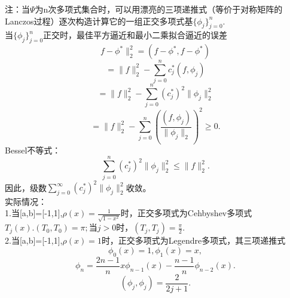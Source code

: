 \documentclass[a4paper,12pt]{article}
\begin{document}
\begin{CJK*}{UTF8}{gbsn}
	注：当$\Psi$为n次多项式集合时，可以用漂亮的三项递推式（等价于对称矩阵的Lanczos过程）逐次构造计算它的一组正交多项式基$\{\phi_j\}_{j=0}^n$.\\
	当$\{\phi_j\}_{j=0}^n$正交时，最佳平方逼近和最小二乘拟合逼近的误差
	$$f-\phi^*\|_2^2 = (f-\phi^*,f-\phi^*)$$
	$$=\|f\|_2^2-\sum\limits_{j=0}^nc_j^*(f,\phi_j)$$
	$$=\|f\|_2^2 - \sum\limits_{j=0}^n(c_j^*)^2\|\phi_j\|_2^2$$
	$$=\|f\|_2^2 - \sum\limits_{j=0}^n(\frac{(f,\phi_j)}{\|\phi_j\|_2})^2\ge 0.$$
	Bessel不等式：
	$$
		\sum\limits_{j=0}^n(c_j^*)^2\|\phi_j\|_2^2\le \|f\|_2^2.
	$$
	因此，级数$\sum\limits_{j=0}^\infty(c_j^*)^2\|\phi_j\|_2^2$收敛。\\
	实际情况：\\
	1.当[a,b]=[-1,1],$\rho(x)=\frac{1}{\sqrt{1-x^2}}$时，正交多项式为Cehbyshev多项式$T_j(x).(T_0,T_0)=\pi;$当$j>0$时，$(T_j,T_j)=\frac{\pi}{2}$.\\
	2.当[a,b]=[-1,1],$\rho(x)=1$时，正交多项式为Legendre多项式，其三项递推式
	$$ \phi_0(x)=1,\phi_1(x)=x, $$
	$$\phi_n=\frac{2n-1}{n}x\phi_{n-1}(x)-\frac{n-1}{n}\phi_{n-2}(x). $$
	$$	(\phi_j,\phi_j)=\frac{2}{2j+1}.$$


\end{CJK*}
\end{document}
